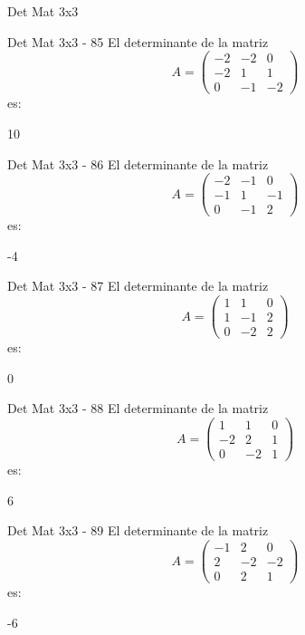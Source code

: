 \documentclass[a4,11pt]{aleph-notas}
\begin{document}
\begin{quiz}{Det Mat 3x3}
\begin{numerical}[tolerance=0]%
    {Det Mat 3x3 - 85}
    El determinante de la matriz
    \[
        A = \begin{pmatrix} -2 & -2 & 0 \\ -2 & 1 & 1 \\ 0 & -1 & -2 \end{pmatrix}
    \]
    es:
    \item[] 10
\end{numerical}

\begin{numerical}[tolerance=0]%
    {Det Mat 3x3 - 86}
    El determinante de la matriz
    \[
        A = \begin{pmatrix} -2 & -1 & 0 \\ -1 & 1 & -1 \\ 0 & -1 & 2 \end{pmatrix}
    \]
    es:
    \item[] -4
\end{numerical}

\begin{numerical}[tolerance=0]%
    {Det Mat 3x3 - 87}
    El determinante de la matriz
    \[
        A = \begin{pmatrix} 1 & 1 & 0 \\ 1 & -1 & 2 \\ 0 & -2 & 2 \end{pmatrix}
    \]
    es:
    \item[] 0
\end{numerical}

\begin{numerical}[tolerance=0]%
    {Det Mat 3x3 - 88}
    El determinante de la matriz
    \[
        A = \begin{pmatrix} 1 & 1 & 0 \\ -2 & 2 & 1 \\ 0 & -2 & 1 \end{pmatrix}
    \]
    es:
    \item[] 6
\end{numerical}

\begin{numerical}[tolerance=0]%
    {Det Mat 3x3 - 89}
    El determinante de la matriz
    \[
        A = \begin{pmatrix} -1 & 2 & 0 \\ 2 & -2 & -2 \\ 0 & 2 & 1 \end{pmatrix}
    \]
    es:
    \item[] -6
\end{numerical}


\end{quiz}
\end{document}
